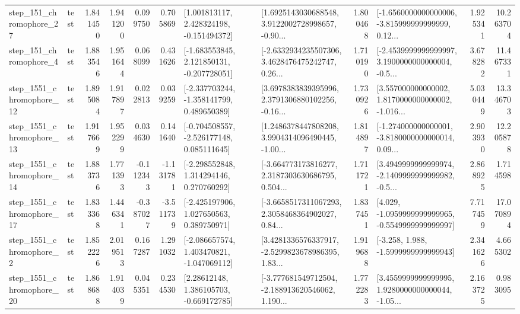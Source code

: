 \begin{tabular}{llrrrrllrlrr}
  step\_151\_chromophore\_27 &      test &      1.841450 &    1.941200 &      0.099750 &  0.705869 &    [1.001813117, 2.428324198, -0.151494372] &  [1.6925143030688548, 3.9122002728998657, -0.90... &       1.800468 &  [-1.6560000000000006, -3.815999999999999, 0.12... &            1.925341 &         10.263704 \\
   step\_151\_chromophore\_4 &      test &      1.883546 &    1.951644 &      0.068099 &  0.431626 &   [-1.683553845, 2.121850131, -0.207728051] &  [-2.6332934235507306, 3.4628476475242747, 0.26... &       1.710190 &  [-2.4539999999999997, 3.1900000000000004, -0.5... &            3.678282 &         11.467331 \\
 step\_1551\_chromophore\_12 &      test &      1.895084 &    1.917897 &      0.022813 &  0.039259 &   [-2.337703244, -1.358141799, 0.489650389] &  [3.6978383839395996, 2.3791306880102256, -0.16... &       1.730926 &  [3.557000000000002, 1.8170000000000002, -1.016... &            5.030449 &         13.346703 \\
 step\_1551\_chromophore\_13 &      test &      1.917669 &    1.952299 &      0.034630 &  0.141640 &   [-0.704508557, -2.526177148, 0.085111645] &  [1.2486378447808208, 3.9904314096490445, -1.00... &       1.814897 &  [-1.274000000000001, -3.8180000000000014, 0.09... &            2.903930 &         12.205878 \\
 step\_1551\_chromophore\_14 &      test &      1.883736 &    1.771393 &     -0.112343 & -1.131781 &    [-2.298552848, 1.314294146, 0.270760292] &  [-3.664773173816277, 2.3187303630686795, 0.504... &       1.711721 &  [3.4949999999999974, -2.1409999999999982, -0.5... &            2.868925 &          1.714598 \\
 step\_1551\_chromophore\_17 &      test &      1.833368 &    1.446341 &     -0.387027 & -3.511739 &    [-2.425197906, 1.027650563, 0.389750971] &  [-3.6658517311067293, 2.3058468364902027, 0.84... &       1.837451 &  [4.029, -1.0959999999999965, -0.5549999999999997] &            7.717459 &         17.070894 \\
  step\_1551\_chromophore\_2 &      test &      1.852226 &    2.019513 &      0.167287 &  1.291032 &   [-2.086657574, 1.403470821, -1.047069112] &  [3.4281336576337917, -2.5299823678986395, 1.83... &       1.919688 &               [-3.258, 1.988, -1.5999999999999943] &            2.341626 &          4.665302 \\
 step\_1551\_chromophore\_20 &      test &      1.868688 &    1.914039 &      0.045351 &  0.234530 &     [2.28612148, 1.386105703, -0.669172785] &  [-3.777681549712504, -2.188913620546062, 1.190... &       1.772283 &  [3.4559999999999995, 1.9280000000000044, -1.05... &            2.163725 &          0.983095 \\

\end{tabular}
